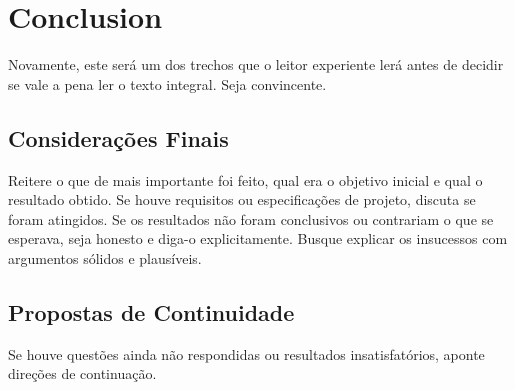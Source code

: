 \chapter{Conclusion}

Novamente, este será um dos trechos que o leitor experiente lerá antes de decidir se vale a pena ler o texto integral. Seja convincente.

\section{Considerações Finais}

Reitere o que de mais importante foi feito, qual era o objetivo inicial e qual o resultado obtido. Se houve requisitos ou especificações de projeto, discuta se foram atingidos. Se os resultados não foram conclusivos ou contrariam o que se esperava, seja honesto e diga-o explicitamente. Busque explicar os insucessos com argumentos sólidos e plausíveis. 

\section{Propostas de Continuidade}

Se houve questões ainda não respondidas ou resultados insatisfatórios, aponte direções de continuação.

\clearpage
